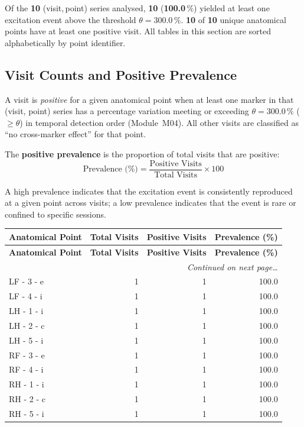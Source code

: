 \documentclass[a4paper,11pt]{article}
\begin{document}
\noindent
Of the \textbf{10} (visit,\,point) series analysed,
\textbf{10} (\textbf{100.0}\,\%) yielded at least one
excitation event above the threshold $\theta = 300.0\,\%$.
\textbf{10} of \textbf{10} unique anatomical points
have at least one positive visit.
All tables in this section are sorted alphabetically by point identifier.

\subsection{Visit Counts and Positive Prevalence}

A visit is \emph{positive} for a given anatomical point when at least one marker in that
(visit, point) series has a percentage variation meeting or exceeding
$\theta = 300.0\,\%$ ($\geq \theta$) in temporal detection order (Module~M04).
All other visits are classified as ``no cross-marker effect'' for that point.

The \textbf{positive prevalence} is the proportion of total visits that are positive:
\[
  \text{Prevalence (\%)} = \frac{\text{Positive Visits}}{\text{Total Visits}} \times 100
\]

A high prevalence indicates that the excitation event is consistently reproduced at a given
point across visits; a low prevalence indicates that the event is rare or confined to
specific sessions.

\begin{small}
\begin{longtable}{p{5cm}rrr}
\toprule
\textbf{Anatomical Point} &
\textbf{Total Visits} &
\textbf{Positive Visits} &
\textbf{Prevalence (\%)} \\
\midrule
\endfirsthead
\toprule
\textbf{Anatomical Point} &
\textbf{Total Visits} &
\textbf{Positive Visits} &
\textbf{Prevalence (\%)} \\
\midrule
\endhead
\midrule
\multicolumn{4}{r}{\small\emph{Continued on next page\ldots}} \\
\endfoot
\bottomrule
\endlastfoot
LF - 3 - e & 1 & 1 & 100.0 \\
LF - 4 - i & 1 & 1 & 100.0 \\
LH - 1 - i & 1 & 1 & 100.0 \\
LH - 2 - c & 1 & 1 & 100.0 \\
LH - 5 - i & 1 & 1 & 100.0 \\
RF - 3 - e & 1 & 1 & 100.0 \\
RF - 4 - i & 1 & 1 & 100.0 \\
RH - 1 - i & 1 & 1 & 100.0 \\
RH - 2 - c & 1 & 1 & 100.0 \\
RH - 5 - i & 1 & 1 & 100.0 \\
\end{longtable}
\end{small}
\end{document}
